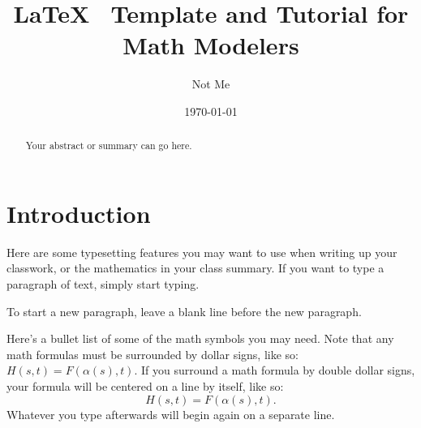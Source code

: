 \documentclass[12pt]{article}   %
\begin{document}


\title{LaTeX \, Template and Tutorial for Math Modelers}
\author{Not Me}
\date{\today}

\maketitle

\begin{abstract}
Your abstract or summary can go here.
\end{abstract}

\newpage

\tableofcontents

\newpage

\section{Introduction}

\vspace{1cm}

Here are some typesetting features you may want to use when writing up your classwork, or
the mathematics in your class summary. If you want to type a paragraph of text, simply
start typing.

To start a new paragraph, leave a blank line before the new paragraph.

\bigskip

Here's a bullet list of some of the math symbols you may need.  Note that any math
formulas must be surrounded by dollar signs, like so:  $H(s,t) = F(\alpha(s),t)$.  If you
surround a math formula by double dollar signs, your formula will be centered on a line by
itself, like so:
$$H(s,t) = F(\alpha(s),t).$$  Whatever you type afterwards will begin again on a separate line.
\end{document}
